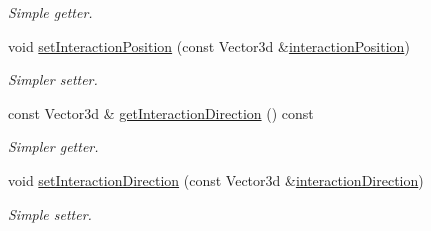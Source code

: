 \begin{DoxyCompactItemize}
\begin{DoxyCompactList}\small\item\em Simple getter. \end{DoxyCompactList}\item 
void \hyperlink{classFormation_a36cb4fa3ae4e3e6f761a2d1f8bb54ccb}{set\+Interaction\+Position} (const Vector3d \&\hyperlink{classFormation_a5e33d98c2b9ec916e601ae27d6c7f2ef}{interaction\+Position})
\begin{DoxyCompactList}\small\item\em Simpler setter. \end{DoxyCompactList}\item 
const Vector3d \& \hyperlink{classFormation_aa7b5cef840f4d1faefa49ef27e72c8f9}{get\+Interaction\+Direction} () const 
\begin{DoxyCompactList}\small\item\em Simpler getter. \end{DoxyCompactList}\item 
void \hyperlink{classFormation_a96fd57ec8928cc70628e0732500dd833}{set\+Interaction\+Direction} (const Vector3d \&\hyperlink{classFormation_aa68570fc8c85c172fadaf93d30367371}{interaction\+Direction})
\begin{DoxyCompactList}\small\item\em Simple setter. \end{DoxyCompactList}\end{DoxyCompactItemize}

